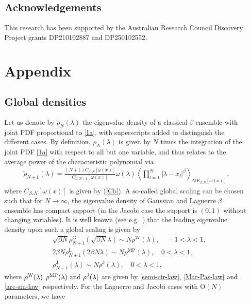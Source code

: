 \documentclass[11pt,a4paper]{article}
\numberwithin{equation}{section} %
\theoremstyle{plain}
\theoremstyle{definition}
\numberwithin{prop}{section}
\numberwithin{cor}{section}
\numberwithin{remark}{section}
\begin{document}
\subsection*{Acknowledgements}
This research has been supported by the Australian Research Council 
Discovery Project grants DP210102887 and DP250102552.


\section*{Appendix}
\subsection*{Global densities}
Let us denote by $\tilde{\rho}_N(\lambda)$ the eigenvalue density of a classical $\beta$ ensemble with joint PDF proportional to \eqref{1a}, with superscripts added  to distinguish the different cases. By definition, $\rho_N(\lambda)$ is given by $N$ times the integration of the joint PDF \eqref{1a} with respect to all but one variable, and thus relates to the average power of the characteristic polynomial via
\begin{align}\label{eig-den}
    \tilde{\rho}_{N+1}(\lambda)=\frac{(N+1)C_{\beta,N}[\omega(x)]}{C_{\beta,N+1}[\omega(x)]}\omega(\lambda)\left\langle\prod_{l=1}^{N}|\lambda-x_l|^\beta\right\rangle_{\mathrm{ME}_{\beta,N}[\omega(x)]},
\end{align}
where $C_{\beta,N}[\omega(x)]$ is given by (\ref{Cb}).
A so-called global scaling can be chosen such that for $N\to\infty$, the eigenvalue density of Gaussian and Laguerre $\beta$ ensemble has compact support (in the Jacobi
case the support is $(0,1)$ without changing variables). 
It is well known (see e.g.~\cite[Ch.~1 and 3]{Fo10}) that the leading eigenvalue density upon such a global scaling is given by
\begin{align}
    &\sqrt{\beta N}\rho_{N+1}^\mathrm{G}(\sqrt{\beta N}\lambda)\sim N \rho^{\mathrm{W}}(\lambda),\quad -1<\lambda<1,\label{5.34}\\
    &2\beta N\rho_{N+1}^\mathrm{L}(2\beta N\lambda)\sim N\rho^{\mathrm{MP}}(\lambda),\quad 0<\lambda<1,\\
    &\rho_{N+1}^\mathrm{J}(\lambda)\sim N\rho^\mathrm{J}(\lambda),\quad 0<\lambda<1,
\end{align}
where $\rho^{\rm W}(\lambda),\rho^{\rm MP}(\lambda)\text{ and } \rho^{\rm J}(\lambda) $ are given by \eqref{semi-cir-law}, \eqref{Mar-Pas-law} and \eqref{arc-sin-law} respectively. For the Laguerre and Jacobi cases with $\mathrm{O}(N)$ parameters, we have
\end{document}
